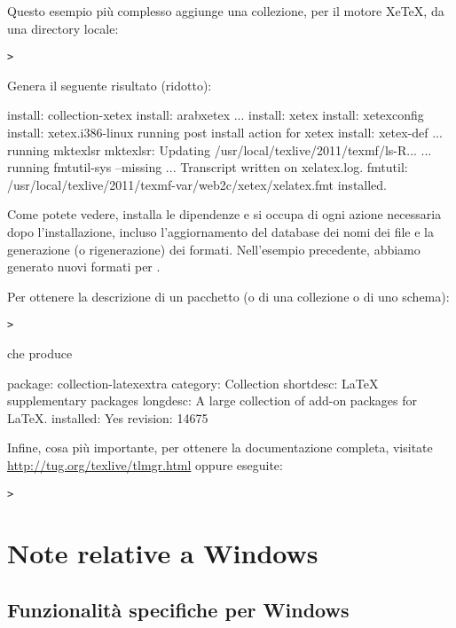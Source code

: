 \documentclass{article}
\begin{document}
Questo esempio più complesso aggiunge una collezione, per il motore
Xe\TeX, da una directory locale:

\begin{alltt}
> 
\end{alltt}
Genera il seguente risultato (ridotto):
\begin{fverbatim}
install: collection-xetex
install: arabxetex
...
install: xetex
install: xetexconfig
install: xetex.i386-linux
running post install action for xetex
install: xetex-def
...
running mktexlsr
mktexlsr: Updating /usr/local/texlive/2011/texmf/ls-R...
...
running fmtutil-sys --missing
...
Transcript written on xelatex.log.
fmtutil: /usr/local/texlive/2011/texmf-var/web2c/xetex/xelatex.fmt installed.
\end{fverbatim}

Come potete vedere,  installa le dipendenze e si occupa di ogni
azione necessaria dopo l'installazione, incluso l'aggiornamento del
database dei nomi dei file e la generazione (o rigenerazione) dei formati.
Nell'esempio precedente, abbiamo generato nuovi formati per \XeTeX.

Per ottenere la descrizione di un pacchetto (o di una collezione o di uno
schema):
\begin{alltt}
> 
\end{alltt}
che produce
\begin{fverbatim}
package:    collection-latexextra
category:   Collection
shortdesc:  LaTeX supplementary packages
longdesc:   A large collection of add-on packages for LaTeX.
installed:  Yes
revision:   14675
\end{fverbatim}

Infine, cosa più importante, per ottenere la documentazione completa,
visitate \url{http://tug.org/texlive/tlmgr.html} oppure eseguite:
\begin{alltt}
> 
\end{alltt}


\section{Note relative a Windows}
\label{sec:windows}


\subsection{Funzionalità specifiche per Windows}
\label{sec:winfeatures}
\end{document}
